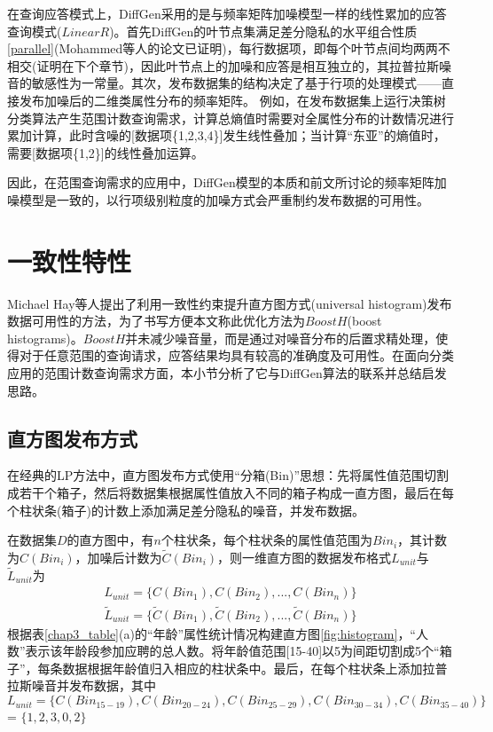 在查询应答模式上，DiffGen采用的是与频率矩阵加噪模型一样的线性累加的应答查询模式($LinearR$)。首先DiffGen的叶节点集满足差分隐私的水平组合性质\ref{parallel}(Mohammed等人的论文\cite{DiffGen}已证明)，每行数据项，即每个叶节点间均两两不相交(证明在下个章节)，因此叶节点上的加噪和应答是相互独立的，其拉普拉斯噪音的敏感性为一常量。其次，发布数据集的结构决定了基于行项的处理模式——直接发布加噪后的二维类属性分布的频率矩阵。
例如，在发布数据集上运行决策树分类算法产生范围计数查询需求，计算总熵值时需要对全属性分布的计数情况进行累加计算，此时含噪的[数据项\{1,2,3,4\}]发生线性叠加；当计算“东亚”的熵值时，需要[数据项\{1,2\}]的线性叠加运算。

因此，在范围查询需求的应用中，DiffGen模型的本质和前文所讨论的频率矩阵加噪模型是一致的，以行项级别粒度的加噪方式会严重制约发布数据的可用性。


\section{一致性特性}

Michael Hay等人提出了利用一致性约束提升直方图方式(universal histogram)发布数据可用性的方法\cite{boosting}，为了书写方便本文称此优化方法为$BoostH$(boost histograms)。$BoostH$并未减少噪音量，而是通过对噪音分布的后置求精处理，使得对于任意范围的查询请求，应答结果均具有较高的准确度及可用性。在面向分类应用的范围计数查询需求方面，本小节分析了它与DiffGen算法的联系并总结启发思路。

\subsection{直方图发布方式}  %

在经典的LP\cite{Dwork Calibrating}方法中，直方图发布方式使用“分箱(Bin)”思想：先将属性值范围切割成若干个箱子，然后将数据集根据属性值放入不同的箱子构成一直方图，最后在每个柱状条(箱子)的计数上添加满足差分隐私的噪音，并发布数据。

在数据集$D$的直方图中，有$n$个柱状条，每个柱状条的属性值范围为$Bin_{i}$，其计数为$C(Bin_{i})$，加噪后计数为$\tilde{C}(Bin_{i})$，则一维直方图的数据发布格式$L_{unit}$与$\tilde{L}_{unit}$为
\[
\begin{split}
	L_{unit} = \{C(Bin_{1}),C(Bin_{2}),...,C(Bin_{n})\}\\
	\tilde{L}_{unit} = \{\tilde{C}(Bin_{1}),\tilde{C}(Bin_{2}),...,\tilde{C}(Bin_{n})\}	
\end{split}
\]
根据表\ref{chap3_table}(a)的“年龄”属性统计情况构建直方图\ref{fig:histogram}，“人数”表示该年龄段参加应聘的总人数。将年龄值范围[15-40]以5为间距切割成5个“箱子”，每条数据根据年龄值归入相应的柱状条中。最后，在每个柱状条上添加拉普拉斯噪音并发布数据，其中$L_{unit} = \{C(Bin_{15-19}),C(Bin_{20-24}),C(Bin_{25-29}),C(Bin_{30-34}),C(Bin_{35-40})\}$ = $\{1,2,3,0,2\}$%

